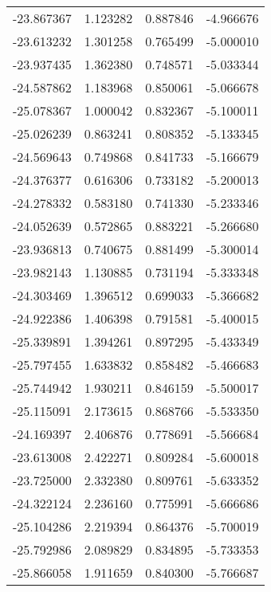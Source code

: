 \begin{tabular}{rrrr}
      -23.867367 &         1.123282 &    0.887846 &  -4.966676 \\
      -23.613232 &         1.301258 &    0.765499 &  -5.000010 \\
      -23.937435 &         1.362380 &    0.748571 &  -5.033344 \\
      -24.587862 &         1.183968 &    0.850061 &  -5.066678 \\
      -25.078367 &         1.000042 &    0.832367 &  -5.100011 \\
      -25.026239 &         0.863241 &    0.808352 &  -5.133345 \\
      -24.569643 &         0.749868 &    0.841733 &  -5.166679 \\
      -24.376377 &         0.616306 &    0.733182 &  -5.200013 \\
      -24.278332 &         0.583180 &    0.741330 &  -5.233346 \\
      -24.052639 &         0.572865 &    0.883221 &  -5.266680 \\
      -23.936813 &         0.740675 &    0.881499 &  -5.300014 \\
      -23.982143 &         1.130885 &    0.731194 &  -5.333348 \\
      -24.303469 &         1.396512 &    0.699033 &  -5.366682 \\
      -24.922386 &         1.406398 &    0.791581 &  -5.400015 \\
      -25.339891 &         1.394261 &    0.897295 &  -5.433349 \\
      -25.797455 &         1.633832 &    0.858482 &  -5.466683 \\
      -25.744942 &         1.930211 &    0.846159 &  -5.500017 \\
      -25.115091 &         2.173615 &    0.868766 &  -5.533350 \\
      -24.169397 &         2.406876 &    0.778691 &  -5.566684 \\
      -23.613008 &         2.422271 &    0.809284 &  -5.600018 \\
      -23.725000 &         2.332380 &    0.809761 &  -5.633352 \\
      -24.322124 &         2.236160 &    0.775991 &  -5.666686 \\
      -25.104286 &         2.219394 &    0.864376 &  -5.700019 \\
      -25.792986 &         2.089829 &    0.834895 &  -5.733353 \\
      -25.866058 &         1.911659 &    0.840300 &  -5.766687 \\

\end{tabular}
